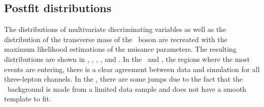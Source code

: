 
\subsection{Postfit distributions}
 The distributions of multivariate discriminating  variables as well as the distribution of the transverse mass of the \PW\ boson are recreated with the maximum likelihood estimations of the nuisance parameters. The resulting distributions are shown in , , , , and . 
 In the \WZCR\ and \TTSR, the regions where the most events  are entering, there is a clear agreement between data and simulation for all three-lepton channels. In the \STSR, there are some jumps due to the fact that the \NPL\ background is made from a limited data sample and does not have a smooth template to fit. 
